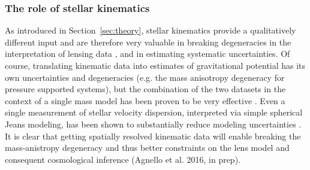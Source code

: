 
\subsubsection{The role of stellar kinematics}

As introduced in Section~\ref{sec:theory}, stellar kinematics provide
a qualitatively different input and are therefore very valuable in
breaking degeneracies in the interpretation of lensing data
\citep[e.g., the mass-sheet degeneracy][]{Koo++03}, and in estimating systematic
uncertainties. Of course, translating kinematic data into estimates of
gravitational potential has its own uncertainties and degeneracies
(e.g. the mass anisotropy degeneracy for pressure supported systems),
but the combination of the two datasets in the context of a single
mass model has been proven to be very effective
\citep{T+K02a,T+K04}. Even a single measurement of stellar velocity dispersion,
interpreted via simple spherical Jeans modeling, has been shown to
substantially reduce modeling uncertainties
\citep{T+K02b,Koo++03,Suy++14}. It is clear that getting spatially
resolved kinematic data will enable breaking the mass-anistropy
degeneracy \citep[see, e.g.,][and references therein]{Cou++14} and
thus better constraints on the lens model and consequent
cosmological inference (Agnello et al. 2016, in prep).

